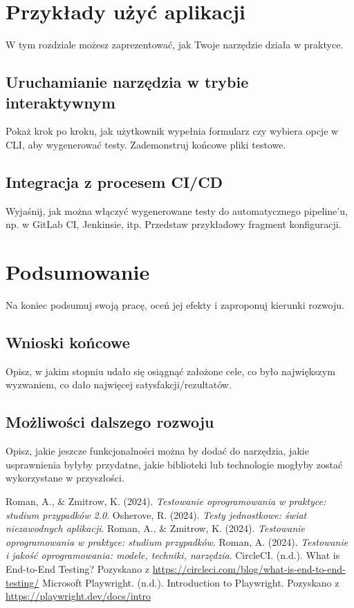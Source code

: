\documentclass[12pt]{report}
\begin{document}
\chapter{Przykłady użyć aplikacji}
{W tym rozdziale możesz zaprezentować, jak Twoje narzędzie działa w praktyce.}

\section{Uruchamianie narzędzia w trybie interaktywnym}
{Pokaż krok po kroku, jak użytkownik wypełnia formularz czy wybiera opcje w CLI, aby wygenerować testy. Zademonstruj końcowe pliki testowe.}

\section{Integracja z procesem CI/CD}
{Wyjaśnij, jak można włączyć wygenerowane testy do automatycznego pipeline’u, np. w GitLab CI, Jenkinsie, itp. Przedstaw przykładowy fragment konfiguracji.}

\chapter{Podsumowanie}
{Na koniec podsumuj swoją pracę, oceń jej efekty i zaproponuj kierunki rozwoju.}

\section{Wnioski końcowe}
{Opisz, w jakim stopniu udało się osiągnąć założone cele, co było największym wyzwaniem, co dało najwięcej satysfakcji/rezultatów.}

\section{Możliwości dalszego rozwoju}
{Opisz, jakie jeszcze funkcjonalności można by dodać do narzędzia, jakie usprawnienia byłyby przydatne, jakie biblioteki lub technologie mogłyby zostać wykorzystane w przyszłości.}

\begin{thebibliography}{9}
     Roman, A., \& Zmitrow, K. (2024). \textit{Testowanie oprogramowania w praktyce: studium przypadków 2.0}.
     Osherove, R. (2024). \textit{Testy jednostkowe: świat niezawodnych aplikacji}.
     Roman, A., \& Zmitrow, K. (2024). \textit{Testowanie oprogramowania w praktyce: studium przypadków}.
     Roman, A. (2024). \textit{Testowanie i jakość oprogramowania: modele, techniki, narzędzia}.
     CircleCI. (n.d.). What is End-to-End Testing? Pozyskano z \url{https://circleci.com/blog/what-is-end-to-end-testing/}
     Microsoft Playwright. (n.d.). Introduction to Playwright. Pozyskano z \url{https://playwright.dev/docs/intro}
\end{thebibliography}
\end{document}
